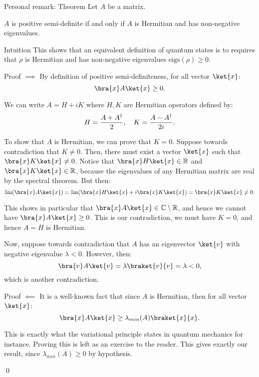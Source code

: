 \documentclass[a4paper]{article}
\begin{document}
\begin{parag}{Personal remark: Theorem}
    Let $A$ be a matrix.

    $A$ is positive semi-definite if and only if $A$ is Hermitian and has non-negative eigenvalues.

    \begin{subparag}{Intuition}
        This shows that an equivalent definition of quantum states is to requires that $\rho$ is Hermitian and has non-negative eigenvalues $\text{eigs}\left(\rho\right) \geq 0$.
    \end{subparag}

    \begin{subparag}{Proof $\implies$}
        By definition of positive semi-definiteness, for all vector $\ket{x}$: 
        \[\bra{x} A \ket{x} \geq 0.\]

        We can write $A = H + iK$ where $H, K$ are Hermitian operators defined by: 
        \[H = \frac{A + A^{\dagger}}{2}, \quad K = \frac{A - A^{\dagger}}{2i}.\]

        To show that $A$ is Hermitian, we can prove that $K = 0$. Suppose towards contradiction that $K \neq 0$. Then, there must exist a vector $\ket{x}$ such that $\bra{x} K \ket{x} \neq 0$. Notice that $\bra{x} H \ket{x} \in \mathbb{R}$ and $\bra{x} K \ket{x} \in \mathbb{R}$, because the eigenvalues of any Hermitian matrix are real by the spectral theorem. But then: 
        \[\cim\left(\bra{x} A \ket{x}\right) = \cim\left(\bra{x} H \ket{x} + i \bra{x} K \ket{x}\right) = \bra{x} K \ket{x} \neq 0.\]
        
        This shows in particular that $\bra{x} A \ket{x} \in \mathbb{C} \setminus \mathbb{R}$, and hence we cannot have $\bra{x} A \ket{x} \geq 0$. This is our contradiction, we must have $K = 0$, and hence $A = H$ is Hermitian.

        Now, suppose towards contradiction that $A$ has an eigenvector $\ket{v}$ with negative eigenvalue $\lambda < 0$. However, then: 
        \[\bra{v} A \ket{v} = \lambda \braket{v}{v} = \lambda < 0,\]
        which is another contradiction.
    \end{subparag}

    \begin{subparag}{Proof $\impliedby$}
        It is a well-known fact that since $A$ is Hermitian, then for all vector $\ket{x}$: 
        \[\bra{x} A \ket{x} \geq \lambda_{min}\left(A\right) \braket{x}{x}.\]
        
        This is exactly what the variational principle states in quantum mechanics for instance. Proving this is left as an exercise to the reader. This gives exactly our result, since $\lambda_{min}\left(A\right) \geq 0$ by hypothesis.

        \qed
    \end{subparag}
\end{parag}
\end{document}
